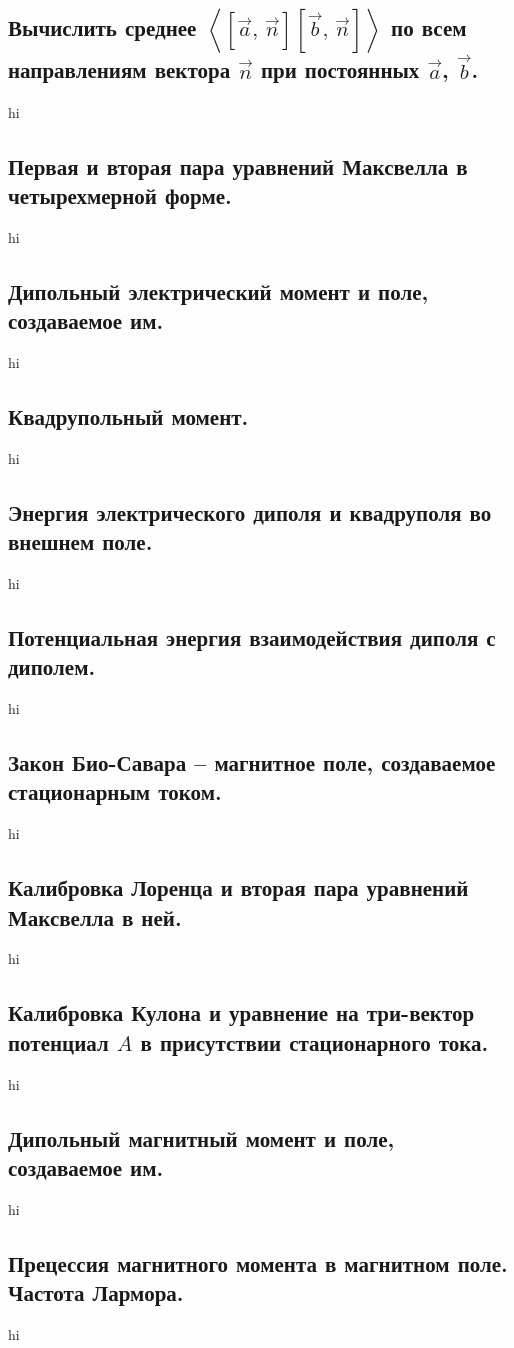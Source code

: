 \documentclass[a4paper,12pt]{article}
\begin{document}
\subsection{Вычислить среднее $\left<\left[ \vec{a},\,\vec{n} \right]
\left[ \vec{b},\,\vec{n} \right]
\right>$ по всем направлениям вектора $\vec{n}$ при постоянных 
$\vec{a}$, $\vec{b}$.}
hi
\subsection{Первая и вторая пара уравнений Максвелла в четырехмерной форме.}
hi
\subsection{Дипольный электрический момент и поле, создаваемое им.}
hi
\subsection{Квадрупольный момент.}
hi
\subsection{Энергия электрического диполя и квадруполя во внешнем поле.}
hi
\subsection{Потенциальная энергия взаимодействия диполя с диполем.}
hi
\subsection{Закон Био-Савара – магнитное поле, создаваемое стационарным током.}
hi
\subsection{Калибровка Лоренца и вторая пара уравнений Максвелла в ней.}
hi
\subsection{Калибровка Кулона и уравнение на три-вектор потенциал $A$ в
присутствии стационарного тока.}
hi
\subsection{Дипольный магнитный момент и поле, создаваемое им.}
hi
\subsection{Прецессия магнитного момента в магнитном поле. Частота Лармора.}
hi
\end{document}
